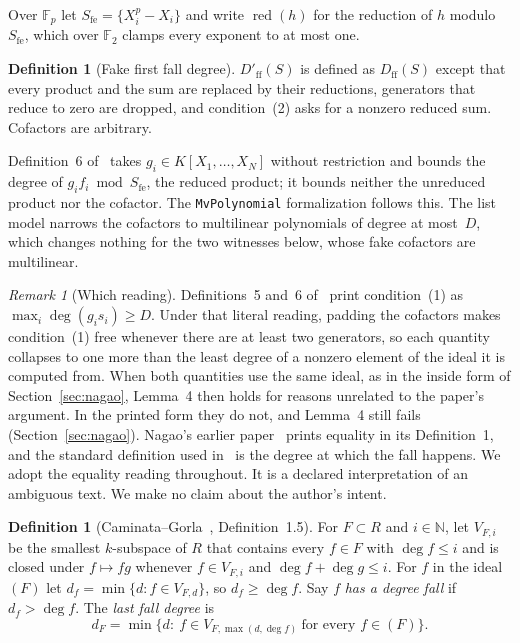 \documentclass[11pt,a4paper]{article}
\theoremstyle{plain}
\theoremstyle{definition}
\newtheorem{definition}[theorem]{Definition}
\theoremstyle{remark}
\newtheorem{remark}[theorem]{Remark}
\newcommand{\FF}{\mathbb{F}}
\newcommand{\Sfe}{S_{\mathrm{fe}}}
\newcommand{\Dff}{D_{\mathrm{ff}}}
\newcommand{\Dfake}{D'_{\mathrm{ff}}}
\newcommand{\red}{\operatorname{red}}
\begin{document}
Over $\FF_p$ let $\Sfe=\{X_i^p-X_i\}$ and write $\red(h)$ for the reduction of
$h$ modulo $\Sfe$, which over $\FF_2$ clamps every exponent to at most one.

\begin{definition}[Fake first fall degree]\label{def:fake}
$\Dfake(S)$ is defined as $\Dff(S)$ except that every product and the sum are
replaced by their reductions, generators that reduce to zero are dropped, and
condition~(2) asks for a nonzero reduced sum. Cofactors are arbitrary.
\end{definition}

Definition~6 of~\cite{nagao15} takes $g_i\in K[X_1,\dots,X_N]$ without restriction
and bounds the degree of $g_if_i \bmod \Sfe$, the reduced product; it bounds
neither the unreduced product nor the cofactor. The \texttt{MvPolynomial}
formalization follows this. The list model narrows the cofactors to multilinear
polynomials of degree at most~$D$, which changes nothing for the two witnesses
below, whose fake cofactors are multilinear.

\begin{remark}[Which reading]\label{rem:reading}
Definitions~5 and~6 of~\cite{nagao15} print condition~(1) as
$\max_i\deg(g_is_i)\ge D$. Under that literal reading, padding the cofactors
makes condition~(1) free whenever there are at least two generators, so each
quantity collapses to one more than the least degree of a nonzero element of
the ideal it is computed from. When both quantities use the same ideal, as in
the inside form of Section~\ref{sec:nagao}, Lemma~4 then holds for reasons
unrelated to the paper's argument. In the printed form they do not, and
Lemma~4 still fails (Section~\ref{sec:nagao}). Nagao's earlier
paper~\cite{nagao13} prints equality in its Definition~1, and the standard
definition used in~\cite{cg} is the degree at which the fall happens. We adopt
the equality reading throughout. It is a declared interpretation of an
ambiguous text. We make no claim about the author's intent.
\end{remark}

\begin{definition}[Caminata--Gorla~\cite{cg}, Definition~1.5]\label{def:V}
For $F\subset R$ and $i\in\mathbb N$, let $V_{F,i}$ be the smallest
$k$-subspace of $R$ that contains every $f\in F$ with $\deg f\le i$ and is
closed under $f\mapsto fg$ whenever $f\in V_{F,i}$ and
$\deg f+\deg g\le i$. For $f$ in the ideal $(F)$ let
$d_f=\min\{d: f\in V_{F,d}\}$, so $d_f\ge\deg f$. Say $f$ \emph{has a degree
fall} if $d_f>\deg f$. The \emph{last fall degree} is
\[
d_F=\min\{d:\ f\in V_{F,\max(d,\deg f)}\ \text{for every } f\in(F)\}.
\]
\end{definition}
\end{document}
